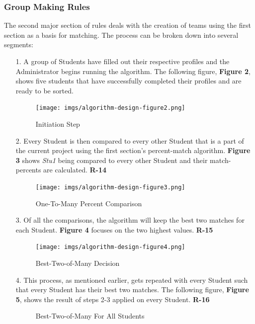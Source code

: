 \documentclass[12pt,letterpaper]{article}
\begin{document}
\subsubsection*{Group Making Rules}
The second major section of rules deals with the creation of teams using the first section as a basis for matching. The process can be broken down into several segments:
\vspace{1em}
\begin{enumerate}
	\item[1.] A group of Students have filled out their respective profiles and the Administrator begins running the algorithm. The following figure, {\bf Figure 2}, shows five students that have successfully completed their profiles and are ready to be sorted. 
\begin{figure}[H]
	\caption{Initiation Step}
	\begin{center}
		\texttt{[image: imgs/algorithm-design-figure2.png]}
	\end{center}
\end{figure}
	\item[2.] Every Student is then compared to every other Student that is a part of the current project using the first section's percent-match algorithm. {\bf Figure 3} shows {\it Stu1} being compared to every other Student and their match-percents are calculated. {\bf R-14}
\begin{figure}[H]
	\caption{One-To-Many Percent Comparison}
	\begin{center}
		\texttt{[image: imgs/algorithm-design-figure3.png]}
	\end{center}
\end{figure}
\newpage{}
	\item[3.] Of all the comparisons, the algorithm will keep the best two matches for each Student. {\bf Figure 4} focuses on the two highest values. {\bf R-15}
\begin{figure}[H]
	\caption{Best-Two-of-Many Decision}
	\begin{center}
		\texttt{[image: imgs/algorithm-design-figure4.png]}
	\end{center}
\end{figure}
	\item[4.] This process, as mentioned earlier, gets repeated with every Student such that every Student has their best two matches. The following figure, {\bf Figure 5}, shows the result of steps 2-3 applied on every Student. {\bf R-16}
\begin{figure}[H]
	\caption{Best-Two-of-Many For All Students}

\end{figure}
\end{enumerate}
\end{document}
